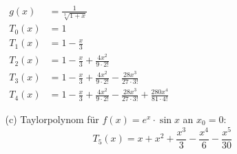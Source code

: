 \documentclass[a4paper,11pt,fleqn]{scrartcl}
\begin{document}
\begin{enumerate}
\begin{enumerate}
\begin{multicols}{2}
                    \(\begin{array}{ll}
                        g(x)   &= \frac{1}{\sqrt[3]{1+x}} \\[0.6em]
                        T_0(x) &= 1 \\[0.3em]
                        T_1(x) &= 1 - \frac{x}{3} \\[0.3em]
                        T_2(x) &= 1 - \frac{x}{3} + \frac{4x^2}{9 \cdot 2!} \\[0.3em]
                        T_3(x) &= 1 - \frac{x}{3} + \frac{4x^2}{9 \cdot 2!} - \frac{28x^3}{27 \cdot 3!} \\[0.3em]
                        T_4(x) &= 1 - \frac{x}{3} + \frac{4x^2}{9 \cdot 2!} - \frac{28x^3}{27 \cdot 3!} + \frac{280x^4}{81 \cdot 4!}
                    \end{array}\)
                \end{multicols}

            \item[(c)]
                Taylorpolynom für $f(x) = e^x \cdot \sin x$ an $x_0 = 0$:
                \[ T_5(x) = x + x^2 + \frac{x^3}{3} - \frac{x^4}{6} - \frac{x^5}{30} \]


\end{enumerate}
\end{enumerate}
\end{document}
